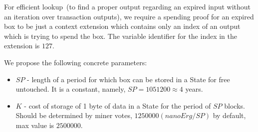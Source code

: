 For efficient lookup~(to find a proper output regarding an expired input without an iteration over transaction outputs),
we require a spending proof for an expired box to be just a context extension which contains only an index of an
output which is trying to spend the box. The variable identifier for the index in the extension is $127$.

We propose the following concrete parameters:
\begin{itemize}
    \item{} $SP$ - length of a period for which box can be stored in a State for free untouched.
    It is a constant, namely, $SP = 1051200 \approx 4$ years.
    \item{} $K$ - cost of storage of 1 byte of data in a State for the period of $SP$ blocks.
    Should be determined by miner votes, $1250000 (nanoErg/SP)$ by default, max value is $2500000$.
\end{itemize}

